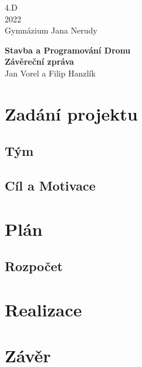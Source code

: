 \documentclass[12pt]{report}
\begin{document}
\begin{titlepage}
	\begin{flushright}
	4.D \\
	2022 \\
	Gymnázium Jana Nerudy
	\end{flushright}
	\vspace*{6cm}
	
	\begin{center}
		\textbf{\huge Stavba a Programování Dronu} \\
		\textbf{\huge Závěreční zpráva } \\[\baselineskip]
		{\LARGE Jan Vorel a Filip Hanzlík}
	\end{center}		
\end{titlepage}


\tableofcontents

\chapter{Zadání projektu}
\section{Tým}
\section{Cíl a Motivace}

\chapter{Plán}
\section{Rozpočet}

\chapter{Realizace}

\chapter{Závěr}
\end{document}
